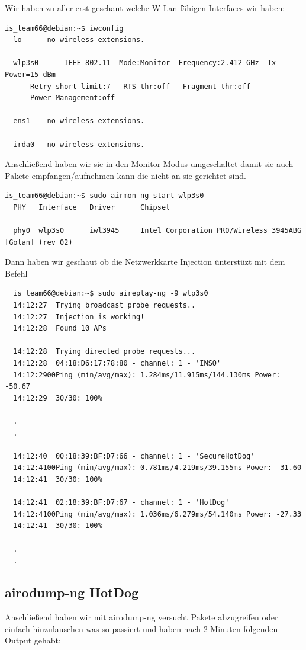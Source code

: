 \documentclass[12pt,a4paper,titlepage,oneside]{scrartcl}
\begin{document}
Wir haben zu aller erst geschaut welche W-Lan fähigen Interfaces wir haben:

\begin{lstlisting}
is_team66@debian:~$ iwconfig
  lo	  no wireless extensions.
  
  wlp3s0	  IEEE 802.11  Mode:Monitor  Frequency:2.412 GHz  Tx-Power=15 dBm
      Retry short limit:7	RTS thr:off   Fragment thr:off
      Power Management:off
  
  ens1	  no wireless extensions.
  
  irda0	  no wireless extensions.
\end{lstlisting}

Anschließend haben wir sie in den Monitor Modus umgeschaltet damit sie auch Pakete empfangen/aufnehmen kann die nicht an sie gerichtet sind.

\begin{lstlisting}
is_team66@debian:~$ sudo airmon-ng start wlp3s0
  PHY	Interface	Driver		Chipset
  
  phy0	wlp3s0		iwl3945 	Intel Corporation PRO/Wireless 3945ABG [Golan] (rev 02)
\end{lstlisting}

Dann haben wir geschaut ob die Netzwerkkarte Injection ünterstüzt mit dem Befehl

\begin{lstlisting}
  is_team66@debian:~$ sudo aireplay-ng -9 wlp3s0
  14:12:27  Trying broadcast probe requests..
  14:12:27  Injection is working!
  14:12:28  Found 10 APs
  
  14:12:28  Trying directed probe requests...
  14:12:28  04:18:D6:17:78:80 - channel: 1 - 'INSO'
  14:12:2900Ping (min/avg/max): 1.284ms/11.915ms/144.130ms Power: -50.67
  14:12:29  30/30: 100%
  
  .
  .
  
  14:12:40  00:18:39:BF:D7:66 - channel: 1 - 'SecureHotDog'
  14:12:4100Ping (min/avg/max): 0.781ms/4.219ms/39.155ms Power: -31.60
  14:12:41  30/30: 100%
  
  14:12:41  02:18:39:BF:D7:67 - channel: 1 - 'HotDog'
  14:12:4100Ping (min/avg/max): 1.036ms/6.279ms/54.140ms Power: -27.33
  14:12:41  30/30: 100%
  
  .
  .
\end{lstlisting}

\subsection{airodump-ng HotDog}
Anschließend haben wir mit airodump-ng versucht Pakete abzugreifen oder einfach hinzulauschen was so passiert und haben nach 2 Minuten folgenden Output gehabt:
\end{document}

